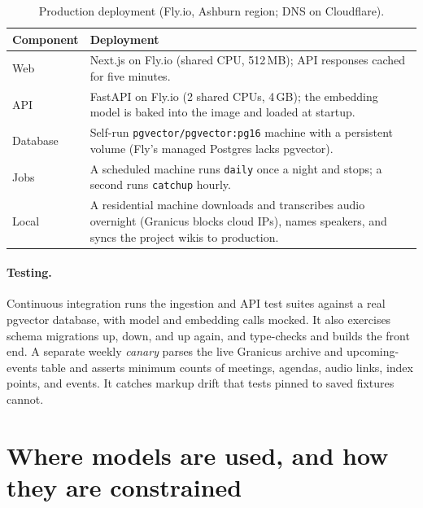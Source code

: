\documentclass[11pt]{article}
\newcommand{\code}[1]{\texttt{#1}}
\begin{document}
\begin{table}[h]
\centering\small
\begin{tabularx}{\linewidth}{@{}lL@{}}
\toprule
Component & Deployment \\
\midrule
Web & Next.js on Fly.io (shared CPU, 512\,MB); API responses cached for five minutes. \\
API & FastAPI on Fly.io (2 shared CPUs, 4\,GB); the embedding model is baked into the image and loaded at startup. \\
Database & Self-run \code{pgvector/pgvector:pg16} machine with a persistent volume (Fly's managed Postgres lacks pgvector). \\
Jobs & A scheduled machine runs \code{daily} once a night and stops; a second runs \code{catchup} hourly. \\
Local & A residential machine downloads and transcribes audio overnight (Granicus blocks cloud IPs), names speakers, and syncs the project wikis to production. \\
\bottomrule
\end{tabularx}
\caption{Production deployment (Fly.io, Ashburn region; DNS on Cloudflare).}
\end{table}

\paragraph{Testing.} Continuous integration runs the ingestion and API test suites against
a real pgvector database, with model and embedding calls mocked. It also exercises schema
migrations up, down, and up again, and type-checks and builds the front end. A separate
weekly \emph{canary} parses the live Granicus archive and upcoming-events table and
asserts minimum counts of meetings, agendas, audio links, index points, and events. It
catches markup drift that tests pinned to saved fixtures cannot.

\section{Where models are used, and how they are constrained}
\end{document}
